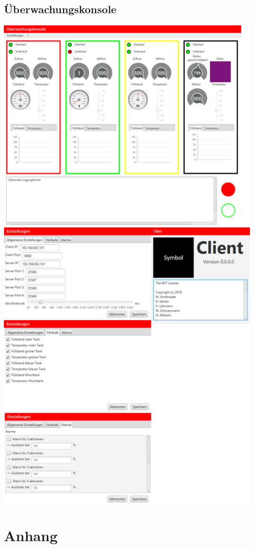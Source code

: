 \documentclass[parskip=full]{scrartcl}
\begin{document}
\subsection{Überwachungskonsole}
\includegraphics[scale=0.40]{media/ui-client.png}

\section{Anhang}
\end{document}
